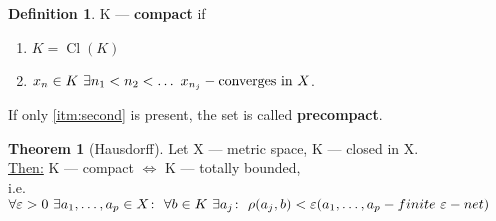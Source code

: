 \documentclass[12pt, fleqn]{article}
\theoremstyle{definition}
\newtheorem*{defn}{Definition}
\theoremstyle{break}
\newtheorem{thm}{Theorem}[section]
\theoremstyle{theorem}
\renewcommand\epsilon{\varepsilon}
\DeclareMathOperator{\clOp}{Cl}
\newcommand{\cl}[1]{\clOp({#1})}
\begin{document}
\begin{defn}
  K --- \textbf{compact} if
  \begin{enumerate}
    \item $K = \cl{K}$
    \item \label{itm:second}$x_n \in K\ \exists n_1 < n_2 < \dotso\ x_{n_j} - \textnormal{converges in $X$}$.
  \end{enumerate}
  If only \ref{itm:second} is present, the set is called \textbf{precompact}.
\end{defn}
\begin{thm}[Hausdorff]
  Let X --- metric space, K --- closed in X. \\
  \underline{Then:} K --- compact $\iff$ K --- totally bounded, \\
  i.e. $\forall \epsilon > 0\ \exists a_1,\dotsc, a_p \in X \colon\ \forall b \in K\ \exists a_j \colon\ \rho(a_j, b) < \epsilon \\
  (a_1, \dotsc, a_p - finite\ \epsilon-net)$
\end{thm}
\end{document}
